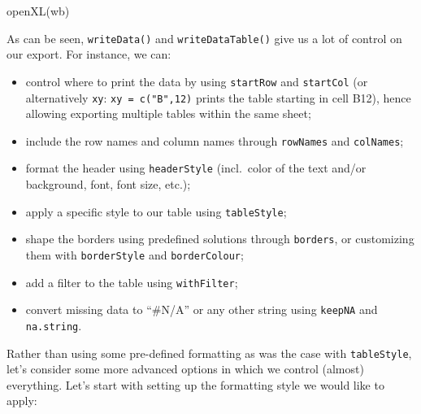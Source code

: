 \documentclass[
]{krantz}
\makeatletter
\newenvironment{Shaded}{\begin{snugshade}}{\end{snugshade}}
\newcommand{\FunctionTok}[1]{\textcolor[rgb]{0,0,0}{#1}}
\newcommand{\NormalTok}[1]{#1}
\providecommand{\tightlist}{%
  \setlength{\itemsep}{0pt}\setlength{\parskip}{0pt}}
\newenvironment{kframe}{%
\medskip{}
\setlength{\fboxsep}{.8em}
 \def\at@end@of@kframe{}%
 \ifinner\ifhmode%
  \def\at@end@of@kframe{\end{minipage}}%
  \begin{minipage}{\columnwidth}%
 \fi\fi%
 \def\FrameCommand##1{\hskip\@totalleftmargin \hskip-\fboxsep
 \colorbox{shadecolor}{##1}\hskip-\fboxsep
     \hskip-\linewidth \hskip-\@totalleftmargin \hskip\columnwidth}%
 \MakeFramed {\advance\hsize-\width
   \@totalleftmargin\z@ \linewidth\hsize
   \@setminipage}}%
 {\par\unskip\endMakeFramed%
 \at@end@of@kframe}
\renewenvironment{Shaded}{\begin{kframe}}{\end{kframe}}
\makeatother
\begin{document}
\begin{Shaded}
\begin{Highlighting}[]
\FunctionTok{openXL}\NormalTok{(wb)}
\end{Highlighting}
\end{Shaded}

As can be seen, \texttt{writeData()} and \texttt{writeDataTable()} give us a lot of control on our export. For instance, we can:

\begin{itemize}
\tightlist
\item
  control where to print the data by using \texttt{startRow} and \texttt{startCol} (or alternatively \texttt{xy}: \texttt{xy\ =\ c("B",12)} prints the table starting in cell B12), hence allowing exporting multiple tables within the same sheet;
\item
  include the row names and column names through \texttt{rowNames} and \texttt{colNames};
\item
  format the header using \texttt{headerStyle} (incl.~color of the text and/or background, font, font size, etc.);
\item
  apply a specific style to our table using \texttt{tableStyle};
\item
  shape the borders using predefined solutions through \texttt{borders}, or customizing them with \texttt{borderStyle} and \texttt{borderColour};
\item
  add a filter to the table using \texttt{withFilter};
\item
  convert missing data to ``\#N/A'' or any other string using \texttt{keepNA} and \texttt{na.string}.
\end{itemize}

Rather than using some pre-defined formatting as was the case with \texttt{tableStyle}, let's consider some more advanced options in which we control (almost) everything. Let's start with setting up the formatting style we would like to apply:
\end{document}
